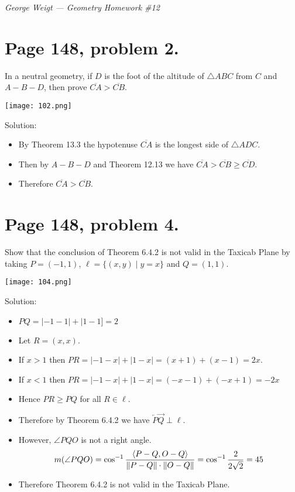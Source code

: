 \documentclass[12pt,openany]{report}
\begin{document}
\noindent
{\it George Weigt --- Geometry Homework \#12}

\section*{Page 148, problem 2.}

In a neutral geometry, if $D$ is the foot of the altitude of $\triangle ABC$
from $C$ and $A{-}B{-}D$, then prove $\overline{CA}>\overline{CB}$.

\texttt{[image: 102.png]}

\noindent
Solution:

\begin{itemize}

\item[]
By Theorem 13.3 the hypotenuse $\overline{CA}$ is the longest side of $\triangle ADC$.

\item[]
Then by $A{-}B{-}D$ and Theorem 12.13 we have $\overline{CA}>\overline{CB}\ge\overline{CD}$.

\item[]
Therefore $\overline{CA}>\overline{CB}$.

\end{itemize}

\newpage

\section*{Page 148, problem 4.}

Show that the conclusion of Theorem 6.4.2 is not valid in the Taxicab Plane
by taking $P=(-1,1)$, $\ell=\{(x,y)\mid y=x\}$ and $Q=(1,1)$.

\texttt{[image: 104.png]}

\noindent
Solution:

\begin{itemize}

\item[]
$PQ=|-1-1|+|1-1]=2$

\item[]
Let $R=(x,x)$.

\item[]
If $x>1$ then $PR=|-1-x|+|1-x|=(x+1)+(x-1)=2x$.

\item[]
If $x<1$ then $PR=|-1-x|+|1-x|=(-x-1)+(-x+1)=-2x$

\item[]
Hence $PR\ge PQ$ for all $R\in\ell$.

\item[]
Therefore by Theorem 6.4.2 we have $\overleftarrow P\overrightarrow Q\perp\ell$.

\item[]
However, $\angle PQO$ is not a right angle.
$$m(\angle PQO)=\cos^{-1}{\langle P-Q,O-Q\rangle\over\|P-Q\|\cdot\|O-Q\|}
=\cos^{-1}{2\over2\sqrt2}=45$$

\item[]
Therefore Theorem 6.4.2 is not valid in the Taxicab Plane.

\end{itemize}
\end{document}

